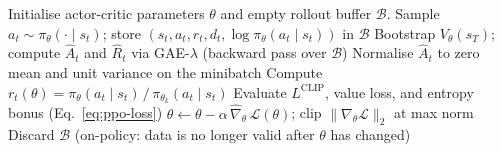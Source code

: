 \documentclass{article}
\begin{document}

\begin{algorithm}[H]
\caption{Proximal Policy Optimization -- PPO-Clip \citep{schulman2017proximal}}
\label{alg:ppo}
\begin{algorithmic}
\State Initialise actor-critic parameters $\theta$ and empty rollout buffer $\mathcal{B}$.
        \State Sample $a_t \sim \pi_\theta(\cdot \mid s_t)$;\; store $(s_t, a_t, r_t, d_t, \log\pi_\theta(a_t \mid s_t))$ in $\mathcal{B}$
    \EndFor
    \State Bootstrap $V_\theta(s_T)$;\; compute $\hat{A}_t$ and $\hat{R}_t$ via GAE-$\lambda$ (backward pass over $\mathcal{B}$)
            \State Normalise $\hat{A}_t$ to zero mean and unit variance on the minibatch
            \State Compute $r_t(\theta) = \pi_\theta(a_t \mid s_t)\,/\,\pi_{\theta_k}(a_t \mid s_t)$
            \State Evaluate $L^{\mathrm{CLIP}}$, value loss, and entropy bonus (Eq.~\ref{eq:ppo-loss})
            \State $\theta \gets \theta - \alpha\,\hat\nabla_\theta\,\mathcal{L}(\theta)$;\; clip $\|\nabla_\theta \mathcal{L}\|_2$ at max norm
        \EndFor
    \EndFor
    \State Discard $\mathcal{B}$ (on-policy: data is no longer valid after $\theta$ has changed)
\EndWhile
\end{algorithmic}
\end{algorithm}

\end{document}
